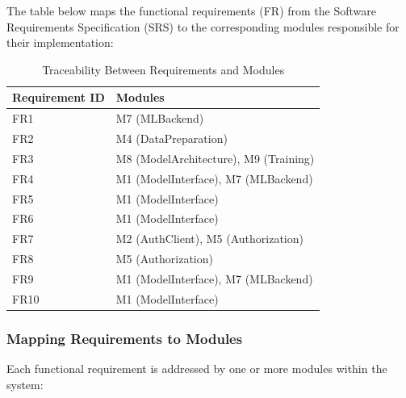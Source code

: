 \documentclass[12pt, titlepage]{article}
\begin{document}
The table below maps the functional requirements (FR) from the Software Requirements Specification (SRS) to the corresponding modules responsible for their implementation:

\begin{table}[H]
\centering
\begin{tabular}{|l|l|}
\hline
\textbf{Requirement ID} & \textbf{Modules} \\ \hline
FR1 & M7 (MLBackend) \\ \hline
FR2 & M4 (DataPreparation) \\ \hline
FR3 & M8 (ModelArchitecture), M9 (Training) \\ \hline
FR4 & M1 (ModelInterface), M7 (MLBackend) \\ \hline
FR5 & M1 (ModelInterface) \\ \hline
FR6 & M1 (ModelInterface) \\ \hline
FR7 & M2 (AuthClient), M5 (Authorization) \\ \hline
FR8 & M5 (Authorization) \\ \hline
FR9 & M1 (ModelInterface), M7 (MLBackend) \\ \hline
FR10 & M1 (ModelInterface) \\ \hline
\end{tabular}
\caption{Traceability Between Requirements and Modules}
\label{TblFRM}
\end{table}

\subsubsection{Mapping Requirements to Modules}
Each functional requirement is addressed by one or more modules within the system:
\end{document}
